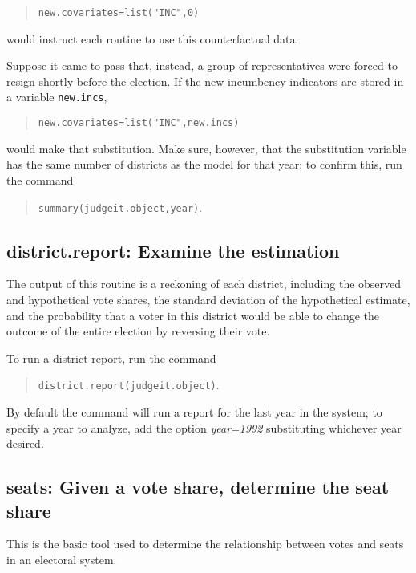\documentclass[oneside,letterpaper,titlepage]{article}
\begin{document}
\begin{quote} \texttt{new.covariates=list("INC",0)} \end{quote}

would instruct each routine to use this counterfactual data.

Suppose it came to pass that, instead, a group of representatives were forced to resign shortly before the election. If the new incumbency indicators are stored in a variable \texttt{new.incs},

\begin{quote} \texttt{new.covariates=list("INC",new.incs)} \end{quote}

would make that substitution. Make sure, however, that the substitution variable has the same number of districts as the model for that year; to confirm this, run the command

\begin{quote} \texttt{summary(judgeit.object,year)}. \end{quote}

\subsection*{district.report: Examine the estimation}

The output of this routine is a reckoning of each district, including the observed and hypothetical vote shares, the standard deviation of the hypothetical estimate, and the probability that a voter in this district would be able to change the outcome of the entire election by reversing their vote.

To run a district report, run the command

\begin{quote} \texttt{district.report(judgeit.object)}. \end{quote}

By default the command will run a report for the last year in the system; to specify a year to analyze, add the option \textit{year=1992} substituting whichever year desired.

\subsection*{seats: Given a vote share, determine the seat share}

This is the basic tool used to determine the relationship between votes and seats in an electoral system.
\end{document}
